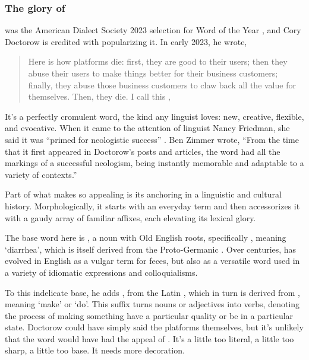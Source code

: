\subsubsection{The glory of }

 was the American Dialect Society 2023 selection for Word of the Year \citep{Roberts2024}, and Cory Doctorow is credited with popularizing it. In early 2023, he wrote,


\begin{quote}
    Here is how platforms die: first, they are good to their users; then they abuse their users to make things better for their business customers; finally, they abuse those business customers to claw back all the value for themselves. Then, they die. I call this ,\hfill\citep{doctorow2023}
\end{quote}

It's a perfectly cromulent word, the kind any linguist loves: new, creative, flexible, and evocative. When it came to the attention of linguist Nancy Friedman, she said it was ``primed for neologistic success'' \citep{friedman2024sweary}. Ben Zimmer wrote, ``From the time that it first appeared in Doctorow's posts and articles, the word had all the markings of a successful neologism, being instantly memorable and adaptable to a variety of contexts.''

Part of what makes  so appealing is its anchoring in a linguistic and cultural history. Morphologically, it starts with an everyday term and then accessorizes it with a gaudy array of familiar affixes, each elevating its lexical glory.

The base word here is , a noun with Old English roots, specifically , meaning `diarrhea', which is itself derived from the Proto-Germanic . Over centuries,  has evolved in English as a vulgar term for feces, but also as a versatile word used in a variety of idiomatic expressions and colloquialisms.

To this indelicate base, he adds , from the Latin , which in turn is derived from , meaning `make' or `do'. This suffix turns nouns or adjectives into verbs, denoting the process of making something have a particular quality or be in a particular state. Doctorow could have simply said the platforms  themselves, but it's unlikely that the word would have had the appeal of . It's a little too literal, a little too sharp, a little too base. It needs more decoration.

